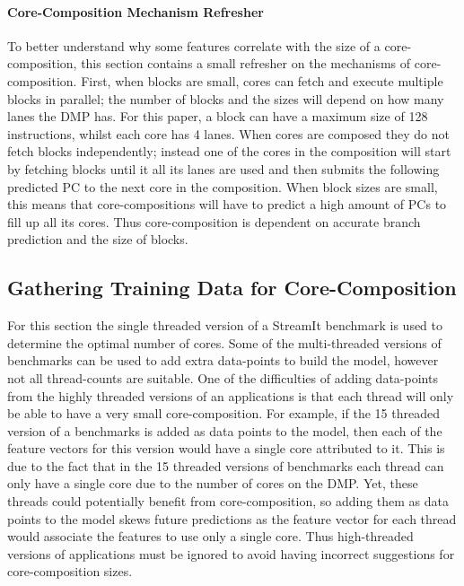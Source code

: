 \paragraph{Core-Composition Mechanism Refresher}
To better understand why some features correlate with the size of a core-composition, this section contains a small refresher on the mechanisms of core-composition.
First, when blocks are small, cores can fetch and execute multiple blocks in parallel; the number of blocks and the sizes will depend on how many lanes the DMP has.
For this paper, a block can have a maximum size of 128 instructions, whilst each core has 4 lanes.
When cores are composed they do not fetch blocks independently; instead one of the cores in the composition will start by fetching blocks until it all its lanes are used and then submits the following predicted PC to the next core in the composition.
When block sizes are small, this means that core-compositions will have to predict a high amount of PCs to fill up all its cores.
Thus core-composition is dependent on accurate branch prediction and the size of blocks.


\subsection{Gathering Training Data for Core-Composition}
For this section the single threaded version of a StreamIt benchmark is used to determine the optimal number of cores.
Some of the multi-threaded versions of benchmarks can be used to add extra data-points to build the model, however not all thread-counts are suitable.
One of the difficulties of adding data-points from the highly threaded versions of an applications is that each thread will only be able to have a very small core-composition.
For example, if the 15 threaded version of a benchmarks is added as data points to the model, then each of the feature vectors for this version would have a single core attributed to it.
This is due to the fact that in the 15 threaded versions of benchmarks each thread can only have a single core due to the number of cores on the DMP.
Yet, these threads could potentially benefit from core-composition, so adding them as data points to the model skews future predictions as the feature vector for each thread would associate the features to use only a single core.
Thus high-threaded versions of applications must be ignored to avoid having incorrect suggestions for core-composition sizes.

